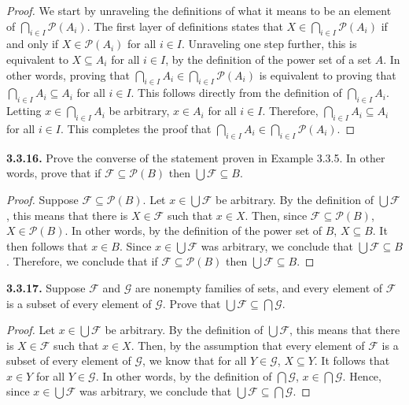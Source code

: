 \documentclass[12pt]{amsart}
\newenvironment{statement}[1]{\smallskip\noindent\color[rgb]{.6627, .3529, .6314} {\bf #1.}}{}
\theoremstyle{definition}
\theoremstyle{remark}
\begin{document}
\begin{proof}
We start by unraveling the definitions of what it means to be an element of $\bigcap_{i \in I} \mathscr{P}(A_i)$.
The first layer of definitions states that $X \in \bigcap_{i \in I} \mathscr{P}(A_i)$ if and only if $X \in \mathscr{P}(A_i)$ for all $i \in I$.
Unraveling one step further, this is equivalent to $X \subseteq A_i$ for all $i \in I$, by the definition of the power set of a set $A$.
In other words, proving that $\bigcap_{i \in I} A_i \in \bigcap_{i \in I} \mathscr{P}(A_i)$ is equivalent to proving that $\bigcap_{i \in I} A_i \subseteq A_i$ for all $i \in I$.
This follows directly from the definition of $\bigcap_{i \in I} A_i$.
Letting $x \in \bigcap_{i \in I} A_i$ be arbitrary, $x \in A_i$ for all $i \in I$.
Therefore, $\bigcap_{i \in I} A_i \subseteq A_i$ for all $i \in I$.
This completes the proof that $\bigcap_{i \in I} A_i \in \bigcap_{i \in I} \mathscr{P}(A_i)$.
\end{proof}


\begin{statement}{3.3.16}
Prove the converse of the statement proven in Example 3.3.5.
In other words, prove that if $\mathcal{F} \subseteq \mathscr{P}(B)$ then $\bigcup \mathcal{F} \subseteq B$.
\end{statement}

\begin{proof}
Suppose $\mathcal{F} \subseteq \mathscr{P}(B)$.
Let $x \in \bigcup \mathcal{F}$ be arbitrary.
By the definition of $\bigcup \mathcal{F}$, this means that there is $X \in \mathcal{F}$ such that $x \in X$.
Then, since $\mathcal{F} \subseteq \mathscr{P}(B)$, $X \in \mathscr{P}(B)$.
In other words, by the definition of the power set of $B$, $X \subseteq B$.
It then follows that $x \in B$.
Since $x \in \bigcup \mathcal{F}$ was arbitrary, we conclude that $\bigcup \mathcal{F} \subseteq B$.
Therefore, we conclude that if $\mathcal{F} \subseteq \mathscr{P}(B)$ then $\bigcup \mathcal{F} \subseteq B$.
\end{proof}


\begin{statement}{3.3.17}
Suppose $\mathcal{F}$ and $\mathcal{G}$ are nonempty families of sets, and every element of $\mathcal{F}$ is a subset of every element of $\mathcal{G}$.
Prove that $\bigcup \mathcal{F} \subseteq \bigcap \mathcal{G}$.
\end{statement}

\begin{proof}
Let $x \in \bigcup \mathcal{F}$ be arbitrary.
By the definition of $\bigcup \mathcal{F}$, this means that there is $X \in \mathcal{F}$ such that $x \in X$.
Then, by the assumption that every element of $\mathcal{F}$ is a subset of every element of $\mathcal{G}$, we know that for all $Y \in \mathcal{G}$, $X \subseteq Y$.
It follows that $x \in Y$ for all $Y \in \mathcal{G}$.
In other words, by the definition of $\bigcap \mathcal{G}$, $x \in \bigcap \mathcal{G}$.
Hence, since $x \in \bigcup \mathcal{F}$ was arbitrary, we conclude that $\bigcup \mathcal{F} \subseteq \bigcap \mathcal{G}$.
\end{proof}
\end{document}
